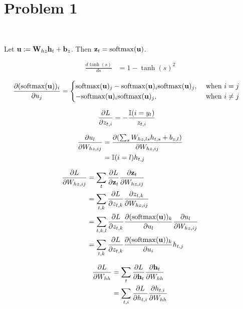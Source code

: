 \section{Problem 1}~\label{sec:prob1}

Let ${\mathbf{u}}:={\mathbf{W}}_{hz}{\mathbf{h}}_t+{\mathbf{b}}_z$.
Then ${\mathbf{z}}_t={\mathop{\mathrm{softmax}}}({\mathbf{u}})$.

\begin{equation}
\begin{split}
    \frac{d \tanh(s)}{d s}
        &= 1 - \tanh(s)^2
\end{split}
\end{equation}

\begin{equation}
\begin{split}
    \frac{\partial ({\mathop{\mathrm{softmax}}}({\mathbf{u}}))_i}{\partial u_j}
        &= \begin{cases}
            {\mathop{\mathrm{softmax}}}({\mathbf{u}})_j-{\mathop{\mathrm{softmax}}}({\mathbf{u}})_i{\mathop{\mathrm{softmax}}}({\mathbf{u}})_j, &\text{ when } i=j \\
            -{\mathop{\mathrm{softmax}}}({\mathbf{u}})_i{\mathop{\mathrm{softmax}}}({\mathbf{u}})_j,&\text{ when } i\neq j
        \end{cases}
\end{split}
\end{equation}

\begin{equation}
\begin{split}
    \frac{\partial L}{\partial z_{t,i}}
        &= -\frac{{\mathbb{I}}(i=y_t)}{z_{t,i}}
\end{split}
\end{equation}

\begin{equation}
\begin{split}
    \frac{\partial u_l}{\partial W_{hz,ij}}
        &= \frac{\partial (\sum_s W_{hz,ls}h_{t,s}+b_{z,l})}{\partial W_{hz,ij}}  \\
        &= {\mathbb{I}}(i=l)h_{t,j}
\end{split}
\end{equation}

\begin{equation}
\begin{split}
    \frac{\partial L}{\partial W_{hz,ij}}
        &= \sum_t \frac{\partial L}{\partial {\mathbf{z}}_t} \frac{\partial {\mathbf{z}}_t}{\partial W_{hz,ij}} \\
        &= \sum_{t,k} \frac{\partial L}{\partial z_{t,k}} \frac{\partial z_{t,k}}{\partial W_{hz,ij}} \\
        &= \sum_{t,k,l} \frac{\partial L}{\partial z_{t,k}} \frac{\partial ({\mathop{\mathrm{softmax}}}({\mathbf{u}}))_k}{\partial u_l}\frac{\partial u_l}{\partial W_{hz,ij}} \\
        &= \sum_{t,k} \frac{\partial L}{\partial z_{t,k}} \frac{\partial ({\mathop{\mathrm{softmax}}}({\mathbf{u}}))_k}{\partial u_i}h_{t,j} \\
\end{split}
\end{equation}

\begin{equation}
\begin{split}
    \frac{\partial L}{\partial W_{hh}}
        &= \sum_t \frac{\partial L}{\partial {\mathbf{h}}_t} \frac{\partial {\mathbf{h}}_t}{\partial W_{hh}} \\
        &= \sum_{t,i} \frac{\partial L}{\partial h_{t,i}} \frac{\partial h_{t,i}}{\partial W_{hh}} \\
\end{split}
\end{equation}
